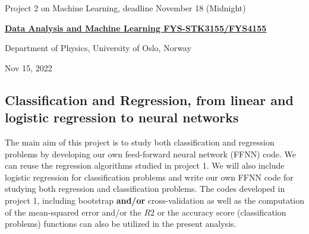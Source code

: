 \documentclass[%
oneside,                 %
final,                   %
10pt]{article}
\begin{document}

\newcommand{\exercisesection}[1]{\subsection*{#1}}






\thispagestyle{empty}

\begin{center}
{\LARGE\bf
\begin{spacing}{1.25}
Project 2 on Machine Learning, deadline November 18 (Midnight)
\end{spacing}
}
\end{center}


\begin{center}
{\bf \href{{http://www.uio.no/studier/emner/matnat/fys/FYS3155/index-eng.html}}{Data Analysis and Machine Learning FYS-STK3155/FYS4155}}
\end{center}

    \begin{center}
\centerline{{\small Department of Physics, University of Oslo, Norway}}
\end{center}
    

\begin{center}
Nov 15, 2022
\end{center}

\vspace{1cm}


\subsection*{Classification and Regression, from linear and logistic regression to neural networks}

The main aim of this project is to study both classification and
regression problems by developing our own feed-forward neural network
(FFNN) code. We can reuse the regression algorithms studied in project
1. We will also include logistic regression for classification
problems and write our own FFNN code for studying both regression and
classification problems.  The codes developed in project 1, including
bootstrap \textbf{and/or} cross-validation as well as the computation of the
mean-squared error and/or the $R2$ or the accuracy score
(classification problems) functions can also be utilized in the
present analysis.
\end{document}
